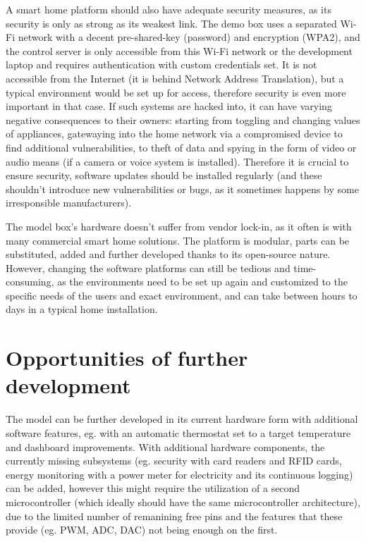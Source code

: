 A smart home platform should also have adequate security measures, as its security is only as strong as its weakest link. The demo box uses a separated Wi-Fi network with a decent pre-shared-key (password) and encryption (WPA2), and the control server is only accessible from this Wi-Fi network or the development laptop and requires authentication with custom credentials set. It is not accessible from the Internet (it is behind Network Address Translation), but a typical environment would be set up for access, therefore security is even more important in that case. If such systems are hacked into, it can have varying negative consequences to their owners: starting from toggling and changing values of appliances, gatewaying into the home network via a compromised device to find additional vulnerabilities, to theft of data and spying in the form of video or audio means (if a camera or voice system is installed). Therefore it is crucial to ensure security, software updates should be installed regularly (and these shouldn't introduce new vulnerabilities or bugs, as it sometimes happens by some irresponsible manufacturers).

The model box's hardware doesn't suffer from vendor lock-in, as it often is with many commercial smart home solutions. The platform is modular, parts can be substituted, added and further developed thanks to its open-source nature. However, changing the software platforms can still be tedious and time-consuming, as the environments need to be set up again and customized to the specific needs of the users and exact environment, and can take between hours to days in a typical home installation.

\section{Opportunities of further development}

The model can be further developed in its current hardware form with additional software features, eg. with an automatic thermostat set to a target temperature and dashboard improvements. With additional hardware components, the currently missing subsystems (eg. security with card readers and RFID cards, energy monitoring with a power meter for electricity and its continuous logging) can be added, however this might require the utilization of a second microcontroller (which ideally should have the same microcontroller architecture), due to the limited number of remanining free pins and the features that these provide (eg. PWM, ADC, DAC) not being enough on the first.

